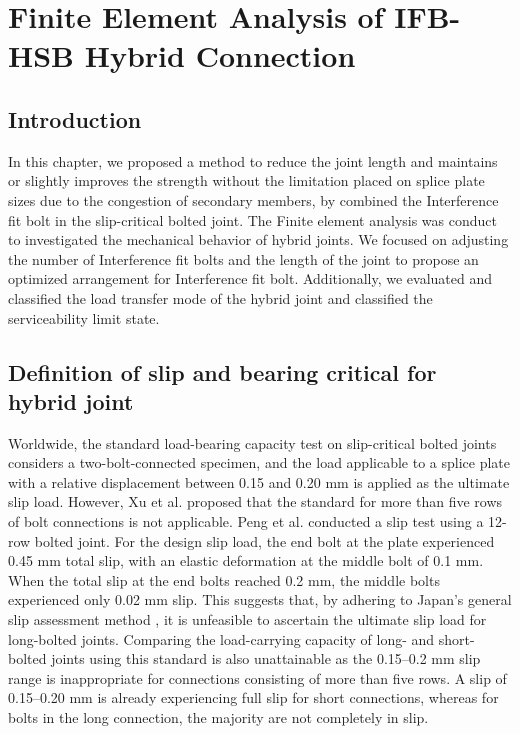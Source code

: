 \chapter{Finite Element Analysis of IFB-HSB Hybrid Connection}
\label{ch5}

\begin{spacing}{1.25} %
\minitoc %
\end{spacing} %
\onehalfspacing %

\section{Introduction}


In this chapter, we proposed a method to reduce the joint length and maintains or slightly improves the strength without the limitation placed on splice plate sizes due to the congestion of secondary members, by combined the Interference fit bolt in the slip-critical bolted joint. The Finite element analysis was conduct to investigated the mechanical behavior of hybrid joints. We focused on adjusting the number of Interference fit bolts and the length of the joint to propose an optimized arrangement for Interference fit bolt. Additionally, we evaluated and classified the load transfer mode of the hybrid joint and classified the serviceability limit state.


\section{Definition of slip and bearing critical for hybrid joint}

Worldwide, the standard load-bearing capacity test on slip-critical bolted joints considers a two-bolt-connected specimen, and the load applicable to a splice plate with a relative displacement between 0.15 and 0.20 mm is applied as the ultimate slip load. However, Xu et al.\cite{xu2011} proposed that the standard for more than five rows of bolt connections is not applicable.  Peng et al.\cite{Peng2013FeaDimensions} conducted a slip test using a 12-row bolted joint. For the design slip load, the end bolt at the plate experienced 0.45 mm total slip, with an elastic deformation at the middle bolt of 0.1 mm. When the total slip at the end bolts reached 0.2 mm, the middle bolts experienced only 0.02 mm slip. This suggests that, by adhering to Japan's general slip assessment method \cite{AIJ2012AIJStructures}, it is unfeasible to ascertain the ultimate slip load for long-bolted joints. Comparing the load-carrying capacity of long- and short-bolted joints using this standard is also unattainable as the 0.15--0.2 mm slip range is inappropriate for connections consisting of more than five rows. A slip of 0.15--0.20 mm is already experiencing full slip for short connections, whereas for bolts in the long connection, the majority are not completely in slip. \par


